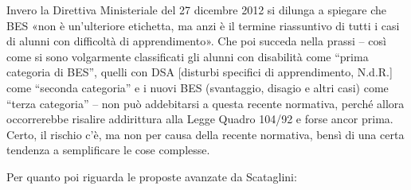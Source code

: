 Invero la Direttiva Ministeriale del 27 dicembre 2012 si dilunga a spiegare che BES «non è un'ulteriore etichetta, ma anzi è il termine riassuntivo di tutti i casi di alunni con difficoltà di apprendimento». Che poi succeda nella prassi – così come si sono volgarmente classificati gli alunni con disabilità come “prima categoria di BES”, quelli con DSA [disturbi specifici di apprendimento, N.d.R.] come “seconda categoria” e i nuovi BES (svantaggio, disagio e altri casi) come “terza categoria” –  non può addebitarsi a questa recente normativa, perché allora occorrerebbe risalire addirittura alla Legge Quadro 104/92 e forse ancor prima. Certo, il rischio c'è, ma non per causa della recente normativa, bensì di una certa tendenza a semplificare le cose complesse.

Per quanto poi riguarda le proposte avanzate da Scataglini:
